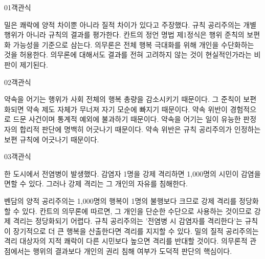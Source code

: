 \documentclass[fs85,seriesWit]{korfarm-base}
\begin{document}
\kfBeginMC
\begin{kfQBlock}{01}{객관식}
\begin{kfChoices}
\kfChoice 밀은 쾌락에 양적 차이뿐 아니라 질적 차이가 있다고 주장했다.
\kfChoice 규칙 공리주의는 개별 행위가 아니라 규칙의 결과를 평가한다.
\kfChoice 칸트의 정언 명법 제1정식은 행위 준칙의 보편화 가능성을 기준으로 삼는다.
\kfChoice 의무론은 전체 행복 극대화를 위해 개인을 수단화하는 것을 허용한다.
\kfChoice 의무론에 대해서도 결과를 전혀 고려하지 않는 것이 현실적인가라는 비판이 제기된다.
\end{kfChoices}
\end{kfQBlock}

\begin{kfQBlock}{02}{객관식}
\begin{kfChoices}
\kfChoice 약속을 어기는 행위가 사회 전체의 행복 총량을 감소시키기 때문이다.
\kfChoice 그 준칙이 보편화되면 약속 제도 자체가 무너져 자기 모순에 빠지기 때문이다.
\kfChoice 약속 위반이 경험적으로 드문 사건이며 통계적 예외에 불과하기 때문이다.
\kfChoice 약속을 어기는 일이 유능한 판정자의 합리적 판단에 명백히 어긋나기 때문이다.
\kfChoice 약속 위반은 규칙 공리주의가 인정하는 보편 규칙에 어긋나기 때문이다.
\end{kfChoices}
\end{kfQBlock}

\begin{kfQBlock}{03}{객관식}
\begin{kfEvidence}한 도시에서 전염병이 발생했다. 감염자 1명을 강제 격리하면 1,000명의 시민이 감염을 면할 수 있다. 그러나 강제 격리는 그 개인의 자유를 침해한다.\end{kfEvidence}
\begin{kfChoices}
\kfChoice 벤담의 양적 공리주의는 1,000명의 행복이 1명의 불행보다 크므로 강제 격리를 정당화할 수 있다.
\kfChoice 칸트의 의무론에 따르면, 그 개인을 단순한 수단으로 사용하는 것이므로 강제 격리는 정당화되기 어렵다.
\kfChoice 규칙 공리주의는 '전염병 시 감염자를 격리한다'는 규칙이 장기적으로 더 큰 행복을 산출한다면 격리를 지지할 수 있다.
\kfChoice 밀의 질적 공리주의는 격리 대상자의 지적 쾌락이 다른 시민보다 높으면 격리를 반대할 것이다.
\kfChoice 의무론적 관점에서는 행위의 결과보다 개인의 권리 침해 여부가 도덕적 판단의 핵심이다.
\end{kfChoices}
\end{kfQBlock}
\end{document}
